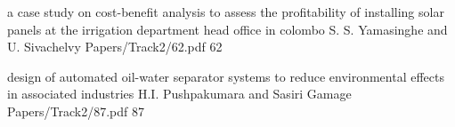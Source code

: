 




   \addpaper
    	{a case study on cost-benefit analysis to assess the profitability of installing solar panels at the irrigation department head office in colombo}
   		 {S. S. Yamasinghe and U. Sivachelvy} 
   		 {Papers/Track2/62.pdf}
        {62} 

        

        

        

        

        

        

        

        

        
        \addpaper
    	{design of automated oil-water separator systems to reduce environmental effects in associated industries}
   		 {H.I. Pushpakumara and Sasiri Gamage} 
   		 {Papers/Track2/87.pdf}
        {87} 

